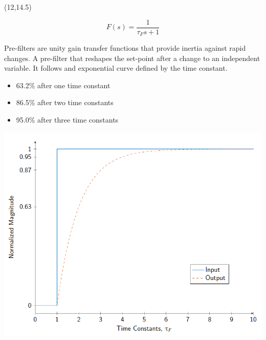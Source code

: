 \documentclass{article}
\def\CHead#1{\begin{center}\noindent{\LARGE\color{DarkBlue} #1}\end{center}}
\renewcommand{\LARGE}{\fontsize{43}{54}\selectfont}
\begin{document}
\begin{textblock}{10}(12,14.5)
\CHead{Pre-Filter}
\begin{equation*}\label{eqn:prefilter}
    F(s)=\frac{1}{\tau_F s+1}    
\end{equation*}

Pre-filters are unity gain transfer functions that provide inertia against rapid changes. A pre-filter that reshapes the set-point after a change to an independent variable. It follows and exponential curve defined by the time constant.
\begin{itemize}
    \item 63.2\% after one time constant
    \item 86.5\% after two time constants
    \item 95.0\% after three time constants
\end{itemize}
\begin{center}
\includegraphics[width=8in]{Prefilter.png}
\end{center}
\end{textblock}
\end{document}
